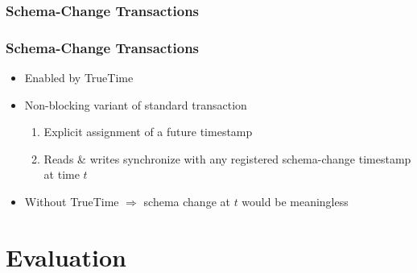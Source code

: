 \documentclass{beamer}
\begin{document}
\subsubsection{Schema-Change Transactions}
\begin{frame}
  \frametitle{Schema-Change Transactions}
  \begin{itemize}
    \item{Enabled by TrueTime}
    \item{Non-blocking variant of standard transaction}
    \begin{enumerate}
      \item{Explicit assignment of a future timestamp}
      \item{Reads \& writes synchronize with any registered schema-change
        timestamp at time $t$
      }
    \end{enumerate}
    \item{Without TrueTime $\Rightarrow$ schema change at $t$ would be meaningless
    }
  \end{itemize}
\end{frame}


\section{Evaluation}
\end{document}
